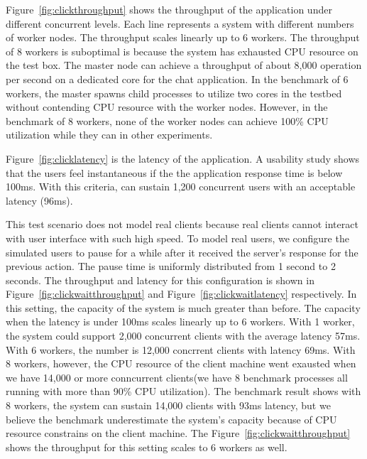 Figure~\ref{fig:clickthroughput} shows the throughput of the application
under different concurrent levels.
Each line represents a \cb{} system with different numbers of worker nodes.
The throughput scales linearly up to 6 workers.
The throughput of 8 workers is suboptimal is because
the system has exhausted CPU resource on the test box.
The master node can achieve a throughput of about 8,000 operation per second on a dedicated core for the
chat application.
In the benchmark of 6 workers, the master spawns child processes to utilize two cores in the testbed
without contending CPU resource with the worker nodes.
However, in the benchmark of 8 workers, none of the worker nodes can achieve 100\% CPU
utilization while they can in other experiments.

\clicklatency{}

Figure~\ref{fig:clicklatency} is the latency of the application.
A usability study shows that the users feel instantaneous if the
the application response time is below 100ms.
With this criteria,
\cb{} can sustain 1,200 concurrent users with an acceptable latency (96ms).


This test scenario does not model real clients because real clients cannot
interact with user interface with such high speed.
To model real users, we configure the simulated users to pause for a while
after it received the server's response for the previous action.
The pause time is uniformly distributed from 1 second to 2 seconds.
The throughput and latency for this configuration is shown
in Figure~\ref{fig:clickwaitthroughput} and Figure~\ref{fig:clickwaitlatency} respectively.
In this setting, the capacity of the system is much greater than before.
The capacity when the latency is under 100ms scales linearly up to 6 workers.
With 1 worker,
the system could support 2,000 concurrent clients with the average latency 57ms.
With 6 workers, the number is 12,000 concrrent clients with latency 69ms.
With 8 workers, however, the CPU resource of the client machine went exausted when we
have 14,000 or more conncurrent clients(we have 8 benchmark processes all running with more than
90\% CPU utilization).
The benchmark result shows with 8 workers, the system can sustain 14,000 clients with 93ms latency,
but we believe the benchmark underestimate the system's capacity because of CPU resource constrains
on the client machine.
The Figure~\ref{fig:clickwaitthroughput} shows the throughput for this setting
scales to 6 workers as well.


